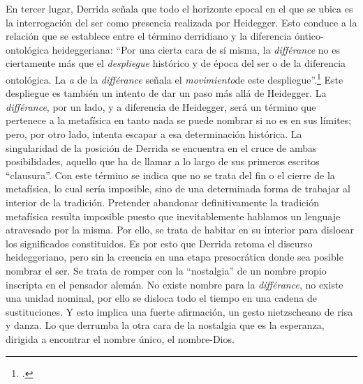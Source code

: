 En tercer lugar, Derrida señala que todo el horizonte epocal en el que se ubica es la interrogación del ser como presencia realizada por Heidegger. Esto conduce a la relación que se establece entre el término derridiano y la diferencia óntico-ontológica heideggeriana: \enquote{Por una cierta cara de sí misma, la \emph{différance} no es ciertamente más que el \emph{despliegue} histórico y de época del ser o de la diferencia ontológica. La \emph{a} de la \emph{différance} señala el \emph{movimiento}de este despliegue}.\footcites[23]{@6980-DERRIDA1989}[La diferencia ontológica sería, así, derivada: \enquote{(\dots) ente y ser, óntico y ontológico, \enquote{óntico-ontológico} serían, en un estilo original, \emph{derivados} respecto de la diferencia; y en relación con lo que más adelante denominaremos la \emph{différance}, concepto económico que designa la producción del diferir, en el doble sentido de esta palabra. La diferencia óntico-ontológica y su fundamento (\emph{Grund}) en la \enquote{trascendencia del Dasein} [\emph{Vom Wesen des Grundes}, p. 16] no serían absolutamente originarios. La \emph{différance} sería más \enquote{originaria}, pero no podría denominársela ya \enquote{origen} ni \enquote{fundamento}, puesto que estas nociones pertenecen esencialmente a la historia de la onto-teología, es decir al sistema que funciona como borradura de la diferencia}.][32]{@6992-DERRIDA1998} Este despliegue es también un intento de dar un paso más allá de Heidegger. La \emph{différance}, por un lado, y a diferencia de Heidegger, será un término que pertenece a la metafísica en tanto nada se puede nombrar si no es en sus límites; pero, por otro lado, intenta escapar a esa determinación histórica. La singularidad de la posición de Derrida se encuentra en el cruce de ambas posibilidades, aquello que ha de llamar a lo largo de sus primeros escritos \enquote{clausura}. Con este término se indica que no se trata del fin o el cierre de la metafísica, lo cual sería imposible, sino de una determinada forma de trabajar al interior de la tradición. Pretender abandonar definitivamente la tradición metafísica resulta imposible puesto que inevitablemente hablamos un lenguaje atravesado por la misma. Por ello, se trata de habitar en su interior para dislocar los significados constituidos. Es por esto que Derrida retoma el discurso heideggeriano, pero sin la creencia en una etapa presocrática donde sea posible nombrar el ser. Se trata de romper con la \enquote{nostalgia} de un nombre propio inscripta en el pensador alemán. No existe nombre para la \emph{différance}, no existe una unidad nominal, por ello se disloca todo el tiempo en una cadena de sustituciones. Y esto implica una fuerte afirmación, un gesto nietzscheano de risa y danza. Lo que derrumba la otra cara de la nostalgia que es la esperanza, dirigida a encontrar el nombre único, el nombre-Dios.

